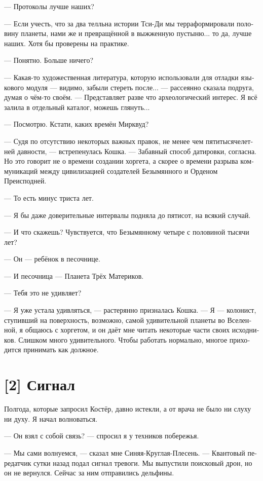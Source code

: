 \documentclass[a4paper,12pt,fleqn]{book}\usepackage{cooltooltips}\usepackage{polyglossia}\setdefaultlanguage[babelshorthands=true]{russian}\setotherlanguage{english}\defaultfontfeatures{Ligatures=TeX,Mapping=tex-text} \usepackage{xcolor}\definecolor{lightgray}{HTML}{bbbbbb}\color{lightgray}\newcommand{\ml}[3]{\textenglish{\textcolor{black}{#3}}}
\begin{document}
{--- Протоколы лучше наших?

--- Если учесть, что за два телльна истории Тси-Ди мы терраформировали половину планеты, нами же и превращённой в выжженную пустыню... то да, лучше наших.
Хотя бы проверены на практике.

--- Понятно.
Больше ничего?

--- Какая-то художественная литература, которую использовали для отладки языкового модуля --- видимо, забыли стереть после... --- рассеянно сказала подруга, думая о чём-то своём.
--- Представляет разве что археологический интерес.
Я всё залила в отдельный каталог, можешь глянуть...

--- Посмотрю.
Кстати, каких времён Мирквуд?

--- Судя по отсутствию некоторых важных правок, не менее чем пятитысячелетней давности, --- встрепенулась Кошка.
--- Забавный способ датировки, согласна.
Но это говорит не о времени создании хоргета, а скорее о времени разрыва коммуникаций между цивилизацией создателей Безымянного и Орденом Преисподней.

--- То есть минус триста лет.

--- Я бы даже доверительные интервалы подняла до пятисот, на всякий случай.

--- И что скажешь?
Чувствуется, что Безымянному четыре с половиной тысячи лет?

--- Он --- ребёнок в песочнице.

--- И песочница --- Планета Трёх Материков.

--- Тебя это не удивляет?

--- Я уже устала удивляться, --- растерянно призналась Кошка.
--- Я --- колонист, ступивший на поверхность, возможно, самой удивительной планеты во Вселенной, я общаюсь с хоргетом, и он даёт мне читать некоторые части своих исходников.
Слишком много удивительного.
Чтобы работать нормально, многое приходится принимать как должное.

\section{[2] Сигнал}

Полгода, которые запросил Костёр, давно истекли, а от врача не было ни слуху ни духу.
Я начал волноваться.

--- Он взял с собой связь? --- спросил я у техников побережья.

--- Мы сами волнуемся, --- сказал мне Синяя-Круглая-Плесень.
--- Квантовый передатчик сутки назад подал сигнал тревоги.
Мы выпустили поисковый дрон, но он не вернулся.
Сейчас за ним отправились дельфины.

}
\end{document}
